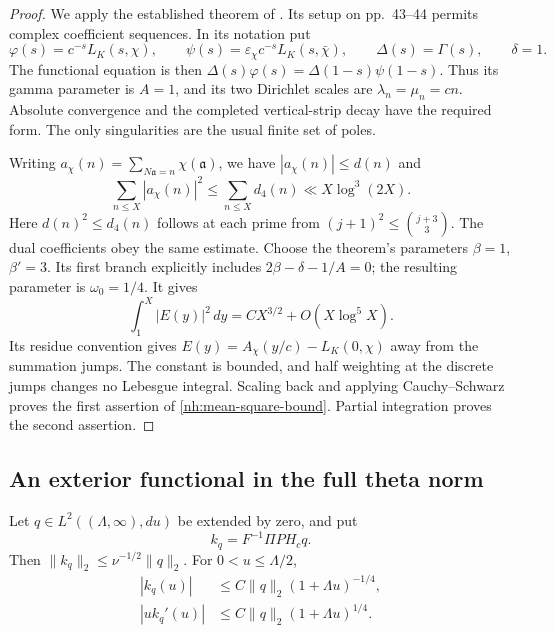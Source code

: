 \begin{proof}
We apply the established theorem of
\citet[Theorem~1, p.~62, equation~(57)]{chandrasekharannar1964}.
Its setup on pp.~43--44 permits complex coefficient sequences.
In its notation put
\[
 \varphi(s)=c^{-s}L_K(s,\chi),\qquad
 \psi(s)=\varepsilon_\chi c^{-s}L_K(s,\bar\chi),\qquad
 \Delta(s)=\Gamma(s),\qquad \delta=1.
\]
The functional equation is then
$\Delta(s)\varphi(s)=\Delta(1-s)\psi(1-s)$.
Thus its gamma parameter is $A=1$, and its two Dirichlet
scales are $\lambda_n=\mu_n=cn$. Absolute convergence and
the completed vertical-strip decay have the required form.
The only singularities are the usual finite set of poles.

Writing $a_\chi(n)=\sum_{N\mathfrak a=n}\chi(\mathfrak a)$,
we have $|a_\chi(n)|\leq d(n)$ and
\[
 \sum_{n\leq X}|a_\chi(n)|^2
 \leq\sum_{n\leq X}d_4(n)\ll X\log^3(2X).
\]
Here $d(n)^2\leq d_4(n)$ follows at each prime from
$(j+1)^2\leq\binom{j+3}{3}$.
The dual coefficients obey the same estimate.
Choose the theorem's parameters $\beta=1$, $\beta'=3$.
Its first branch explicitly includes
$2\beta-\delta-1/A=0$; the resulting parameter is
$\omega_0=1/4$. It gives
\[
 \int_1^X|E(y)|^2\,dy=C X^{3/2}+O(X\log^5X).
\]
Its residue convention gives
$E(y)=A_\chi(y/c)-L_K(0,\chi)$ away from the summation
jumps. The constant is bounded, and half weighting at the
discrete jumps changes no Lebesgue integral. Scaling back
and applying Cauchy--Schwarz proves the first assertion of
\eqref{nh:mean-square-bound}. Partial integration proves the
second assertion.
\end{proof}

\subsection{An exterior functional in the full theta norm}

\begin{lemma}\label{nh:row}
Let $q\in L^2((\Lambda,\infty),du)$ be extended by zero,
and put
\[
 k_q=F^{-1}\Pi PH_cq.
\]
Then $\|k_q\|_2\leq\nu^{-1/2}\|q\|_2$. For
$0<u\leq\Lambda/2$,
\begin{align}
 |k_q(u)|&\leq C\|q\|_2(1+\Lambda u)^{-1/4},
       \label{nh:pointwise}\\
 |u k_q'(u)|&\leq C\|q\|_2(1+\Lambda u)^{1/4}.
       \label{nh:derivative}
\end{align}
\end{lemma}

